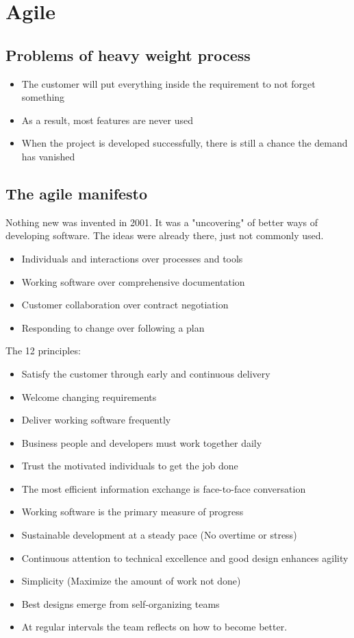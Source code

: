 \documentclass[12pt]{article}
\begin{document}
\section*{Agile}
\subsection*{Problems of heavy weight process}
\begin{itemize}
    \item The customer will put everything inside the requirement to not forget something
    \item As a result, most features are never used
    \item When the project is developed successfully, there is still a chance the demand has vanished
\end{itemize}
\subsection*{The agile manifesto}
Nothing new was invented in 2001. It was a "uncovering" of better ways of developing software.
The ideas were already there, just not commonly used.
\begin{itemize}
    \item Individuals and interactions over processes and tools
    \item Working software over comprehensive documentation
    \item Customer collaboration over contract negotiation
    \item Responding to change over following a plan
\end{itemize}
The 12 principles:
\begin{itemize}
    \item Satisfy the customer through early and continuous delivery
    \item Welcome changing requirements
    \item Deliver working software frequently
    \item Business people and developers must work together daily
    \item Trust the motivated individuals to get the job done
    \item The most efficient information exchange is face-to-face conversation
    \item Working software is the primary measure of progress
    \item Sustainable development at a steady pace (No overtime or stress)
    \item Continuous attention to technical excellence and good design enhances agility
    \item Simplicity (Maximize the amount of work not done)
    \item Best designs emerge from self-organizing teams
    \item At regular intervals the team reflects on how to become better.
\end{itemize}
\end{document}
